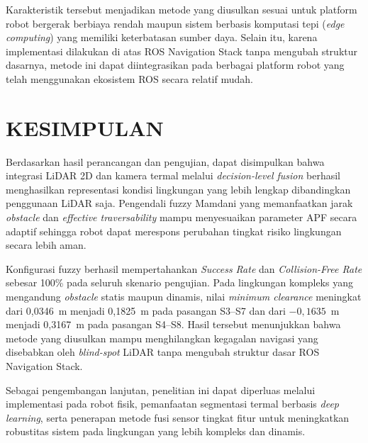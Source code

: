 \documentclass[10pt,twocolumn]{article}
\begin{document}
Karakteristik tersebut menjadikan metode yang diusulkan sesuai untuk platform robot bergerak berbiaya rendah maupun sistem berbasis komputasi tepi (\textit{edge computing}) yang memiliki keterbatasan sumber daya. Selain itu, karena implementasi dilakukan di atas ROS Navigation Stack tanpa mengubah struktur dasarnya, metode ini dapat diintegrasikan pada berbagai platform robot yang telah menggunakan ekosistem ROS secara relatif mudah.

\section{KESIMPULAN}

Berdasarkan hasil perancangan dan pengujian, dapat disimpulkan bahwa integrasi LiDAR 2D dan kamera termal melalui \textit{decision-level fusion} berhasil menghasilkan representasi kondisi lingkungan yang lebih lengkap dibandingkan penggunaan LiDAR saja. Pengendali fuzzy Mamdani yang memanfaatkan jarak \textit{obstacle} dan \textit{effective traversability} mampu menyesuaikan parameter APF secara adaptif sehingga robot dapat merespons perubahan tingkat risiko lingkungan secara lebih aman.

Konfigurasi fuzzy berhasil mempertahankan \textit{Success Rate} dan \textit{Collision-Free Rate} sebesar 100\% pada seluruh skenario pengujian. Pada lingkungan kompleks yang mengandung \textit{obstacle} statis maupun dinamis, nilai \textit{minimum clearance} meningkat dari 0,0346~m menjadi 0,1825~m pada pasangan S3--S7 dan dari $-0,1635$~m menjadi 0,3167~m pada pasangan S4--S8. Hasil tersebut menunjukkan bahwa metode yang diusulkan mampu menghilangkan kegagalan navigasi yang disebabkan oleh \textit{blind-spot} LiDAR tanpa mengubah struktur dasar ROS Navigation Stack.

Sebagai pengembangan lanjutan, penelitian ini dapat diperluas melalui implementasi pada robot fisik, pemanfaatan segmentasi termal berbasis \textit{deep learning}, serta penerapan metode fusi sensor tingkat fitur untuk meningkatkan robustitas sistem pada lingkungan yang lebih kompleks dan dinamis.
\end{document}
